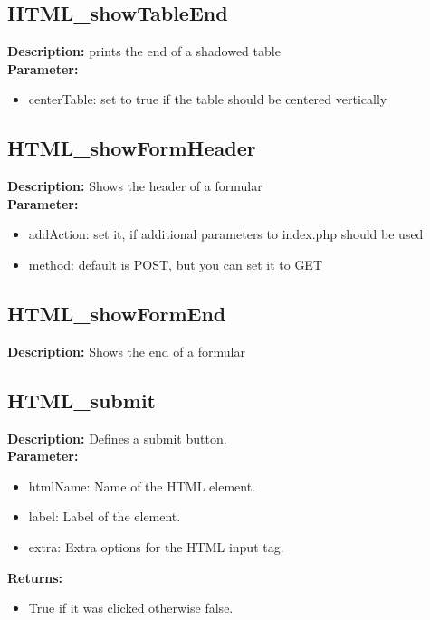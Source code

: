 \subsection{HTML\_showTableEnd}
\textbf{Description:} prints the end of a shadowed table\\
\textbf{Parameter:}
\begin{itemize}
\item centerTable: set to true if the table should be centered vertically
\end{itemize}

\subsection{HTML\_showFormHeader}
\textbf{Description:} Shows the header of a formular\\
\textbf{Parameter:}
\begin{itemize}
\item addAction: set it, if additional parameters to index.php should be used
\item method: default is POST, but you can set it to GET
\end{itemize}

\subsection{HTML\_showFormEnd}
\textbf{Description:} Shows the end of a formular\\

\subsection{HTML\_submit}
\textbf{Description:} Defines a submit button.\\
\textbf{Parameter:}
\begin{itemize}
\item htmlName: Name of the HTML element.
\item label: Label of the element.
\item extra: Extra options for the HTML input tag.
\end{itemize}
\textbf{Returns:}
\begin{itemize}
\item True if it was clicked otherwise false.
\end{itemize}

